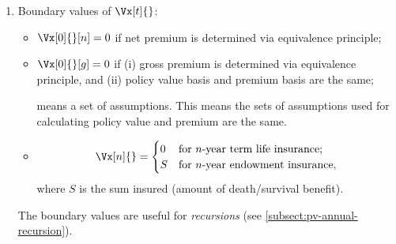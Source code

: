 \begin{enumerate}
\begin{intuition}
The definition is ``similar'' to the definition for ``ordinary'' value. Value
of a ``nonrandom'' project at time \(t\) may be defined as the present
value\footnote{The interest rate used is ``risk-free rate''.} of present/future
(nonrandom) net cash (in)flows at time \(t\) . This is also the amount of
 received when the project is ``fairly sold'' at time \(t\)
(intuitively, this is its ``worth'' at time \(t\)).

On the other hand, the policy value at time \(t\) is the \emph{actuarial}
present value of ``future'' cash \emph{outflows} (from the insurer's
 perspective). It may be understood intuitively (and
informally) as ``amount of  \emph{paid} (by )
when the policy  is `fairly transferred' to another party
''. As a ``simple'' framework for reserving, this
amount  may be treated as the amount of reserve held at time
\(t\).
\end{intuition}


\item \label{it:pv-boundary-values}
Boundary values of \(\Vx[t]{}\):
\begin{itemize}
\item \(\Vx[0]{}[n]=0\) if net premium is determined via equivalence principle;
\item \(\Vx[0]{}[g]=0\) if (i) gross premium is determined via equivalence
principle, and (ii) policy value basis and premium basis are the same;
\begin{note}
 means a set of assumptions. This means the sets of assumptions
used for calculating policy value and premium are the same.
\end{note}
\item \[
\Vx[n]{}
=\begin{cases}
0&\text{for \(n\)-year term life insurance}; \\
S&\text{for \(n\)-year endowment insurance},
\end{cases}
\]
where \(S\) is the sum insured (amount of death/survival benefit).
\end{itemize}
\begin{note}
The boundary values are useful for \emph{recursions} (see
\cref{subsect:pv-annual-recursion}).
\end{note}
\end{enumerate}

